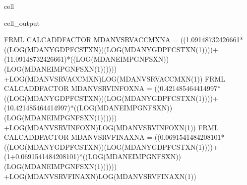 \documentclass[letterpaper,10pt,english]{jupyterBook}
\begin{document}
\begin{sphinxuseclass}{cell}
\begin{sphinxVerbatimOutput}
\begin{sphinxuseclass}{cell_output}
\begin{sphinxVerbatim}[commandchars=\\\{\}]
FRML \PYGZlt{}CALC\PYGZus{}ADD\PYGZus{}FACTOR\PYGZgt{} MDANVSRVACCMXN\PYGZus{}A = \PYGZhy{} ((1.09148732426661*((LOG(MDANYGDPFCSTXN))\PYGZhy{}(LOG(MDANYGDPFCSTXN(\PYGZhy{}1))))+(1\PYGZhy{}1.09148732426661)*((LOG(MDANEIMPGNFSXN))\PYGZhy{}(LOG(MDANEIMPGNFSXN(\PYGZhy{}1)))))) +LOG(MDANVSRVACCMXN)\PYGZhy{}LOG(MDANVSRVACCMXN(\PYGZhy{}1))\PYGZdl{}
FRML \PYGZlt{}CALC\PYGZus{}ADD\PYGZus{}FACTOR\PYGZgt{} MDANVSRVINFOXN\PYGZus{}A = \PYGZhy{} ((0.421485464414997*((LOG(MDANYGDPFCSTXN))\PYGZhy{}(LOG(MDANYGDPFCSTXN(\PYGZhy{}1))))+(1\PYGZhy{}0.421485464414997)*((LOG(MDANEIMPGNFSXN))\PYGZhy{}(LOG(MDANEIMPGNFSXN(\PYGZhy{}1)))))) +LOG(MDANVSRVINFOXN)\PYGZhy{}LOG(MDANVSRVINFOXN(\PYGZhy{}1))\PYGZdl{}
FRML \PYGZlt{}CALC\PYGZus{}ADD\PYGZus{}FACTOR\PYGZgt{} MDANVSRVFINAXN\PYGZus{}A = \PYGZhy{} ((\PYGZhy{}0.0691541484208101*((LOG(MDANYGDPFCSTXN))\PYGZhy{}(LOG(MDANYGDPFCSTXN(\PYGZhy{}1))))+(1+0.0691541484208101)*((LOG(MDANEIMPGNFSXN))\PYGZhy{}(LOG(MDANEIMPGNFSXN(\PYGZhy{}1)))))) +LOG(MDANVSRVFINAXN)\PYGZhy{}LOG(MDANVSRVFINAXN(\PYGZhy{}1))\PYGZdl{}
\end{sphinxVerbatim}

\end{sphinxuseclass}\end{sphinxVerbatimOutput}

\end{sphinxuseclass}
\end{document}
